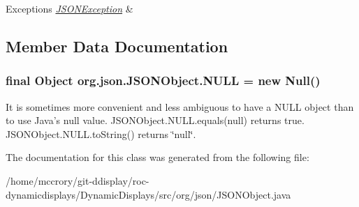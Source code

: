 \begin{DoxyExceptions}{Exceptions}
{\em \hyperlink{classorg_1_1json_1_1JSONException}{J\-S\-O\-N\-Exception}} & \\
\hline
\end{DoxyExceptions}


\subsection{Member Data Documentation}
\hypertarget{classorg_1_1json_1_1JSONObject_a01c74a31a1abfd34ab13beb9347855ac}{
\subsubsection[{N\-U\-L\-L}]{\setlength{\rightskip}{0pt plus 5cm}final Object org.\-json.\-J\-S\-O\-N\-Object.\-N\-U\-L\-L = new Null()\hspace{0.3cm}{\ttfamily [static]}}}\label{classorg_1_1json_1_1JSONObject_a01c74a31a1abfd34ab13beb9347855ac}
It is sometimes more convenient and less ambiguous to have a {\ttfamily N\-U\-L\-L} object than to use Java's {\ttfamily null} value. {\ttfamily J\-S\-O\-N\-Object.\-N\-U\-L\-L.\-equals(null)} returns {\ttfamily true}. {\ttfamily J\-S\-O\-N\-Object.\-N\-U\-L\-L.\-to\-String()} returns {\ttfamily \char`\"{}null\char`\"{}}. 

The documentation for this class was generated from the following file\-:\begin{DoxyCompactItemize}
\item 
/home/mccrory/git-\/ddisplay/roc-\/dynamicdisplays/\-Dynamic\-Displays/src/org/json/J\-S\-O\-N\-Object.\-java\end{DoxyCompactItemize}
